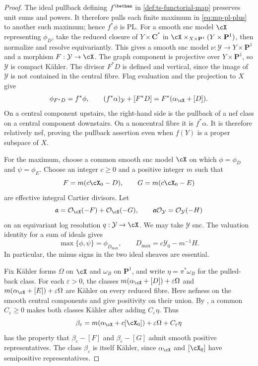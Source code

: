 \begin{proof}
The ideal pullback defining $f^{\bethan}$ in
\cref{def:ts-functorial-map} preserves unit sums and powers.
It therefore pulls each finite maximum in \eqref{eq:mp-pl-plus}
to another such maximum; hence $f^*\phi$ is PL.
For a smooth snc model $\cX$ representing $\phi_D$, take the
reduced closure of $Y\times\mathbf C^*$ in
$\cX\times_{X\times\mathbf P^1}(Y\times\mathbf P^1)$,
then normalize and resolve equivariantly. This gives a smooth snc model
$\nu:\mathcal Y\to Y\times\mathbf P^1$ and a morphism
$F:\mathcal Y\to\cX$. The graph component is projective over
$Y\times\mathbf P^1$, so $\mathcal Y$ is compact K\"ahler.
The divisor $F^*D$ is defined and vertical, since the image of
$\mathcal Y$ is not contained in the central fibre. Flag evaluation
and the projection to $X$ give
\[
 \phi_{F^*D}=f^*\phi,
 \qquad
 (f^*\alpha)_{\mathcal Y}+[F^*D]
             =F^*(\alpha_{\cX}+[D]).
\]
On a central component upstairs, the right-hand side is the pullback
of a nef class on a central component downstairs. On a noncentral
fibre it is $f^*\alpha$. It is therefore relatively nef, proving
the pullback assertion even when $f(Y)$ is a proper subspace of $X$.

For the maximum, choose a common smooth snc model $\cX$ on which
$\phi=\phi_D$ and $\psi=\phi_E$.  Choose an integer $c\geq0$ and
a positive integer $m$ such that
\[
 F=m(c\cX_0-D),\qquad G=m(c\cX_0-E)
\]
are effective integral Cartier divisors.  Let
\[
 \mathfrak a=\mathcal O_{\cX}(-F)+\mathcal O_{\cX}(-G),
 \qquad
 \mathfrak a\mathcal O_{\mathcal Y}=\mathcal O_{\mathcal Y}(-H)
\]
on an equivariant log resolution $q:\mathcal Y\to\cX$.  We may take
$\mathcal Y$ snc.  The valuation identity for a sum of ideals gives
\[
 \max\{\phi,\psi\}=\phi_{D_{\max}},
 \qquad D_{\max}=c\mathcal Y_0-m^{-1}H.
\]
In particular, the minus signs in the two ideal sheaves are essential.

Fix K\"ahler forms $\Omega$ on $\cX$ and $\omega_B$ on
$\mathbf P^1$, and write $\eta=\pi^*\omega_B$ for the pulled-back
class.  For each $\varepsilon>0$, the classes
$m(\alpha_{\cX}+[D])+\varepsilon\Omega$ and
$m(\alpha_{\cX}+[E])+\varepsilon\Omega$ are K\"ahler on every
reduced fibre.  Here nefness on the smooth central components and
\cite[Proposition~3.3(ii)]{DP04} give positivity on their union.
By , a common $C_\varepsilon\geq0$
makes both classes K\"ahler after adding $C_\varepsilon\eta$.  Thus
\[
 \beta_\varepsilon
 =m(\alpha_{\cX}+c[\cX_0])+\varepsilon\Omega
       +C_\varepsilon\eta
\]
has the property that $\beta_\varepsilon-[F]$ and
$\beta_\varepsilon-[G]$ admit smooth positive representatives.
The class $\beta_\varepsilon$ is itself K\"ahler, since
$\alpha_{\cX}$ and $[\cX_0]$ have semipositive representatives.


\end{proof}
